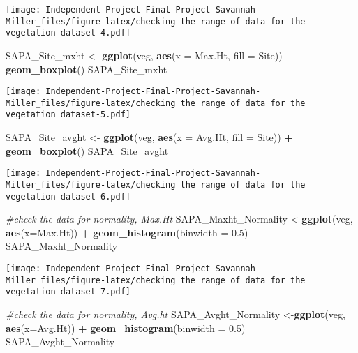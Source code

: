 \documentclass[
]{article}
\newenvironment{Shaded}{\begin{snugshade}}{\end{snugshade}}
\newcommand{\AttributeTok}[1]{\textcolor[rgb]{0.13,0.29,0.53}{#1}}
\newcommand{\CommentTok}[1]{\textcolor[rgb]{0.56,0.35,0.01}{\textit{#1}}}
\newcommand{\FloatTok}[1]{\textcolor[rgb]{0.00,0.00,0.81}{#1}}
\newcommand{\FunctionTok}[1]{\textcolor[rgb]{0.13,0.29,0.53}{\textbf{#1}}}
\newcommand{\NormalTok}[1]{#1}
\newcommand{\OtherTok}[1]{\textcolor[rgb]{0.56,0.35,0.01}{#1}}
\newcommand{\SpecialCharTok}[1]{\textcolor[rgb]{0.81,0.36,0.00}{\textbf{#1}}}
\begin{document}
\texttt{[image: Independent-Project-Final-Project-Savannah-Miller\_files/figure-latex/checking the range of data for the vegetation dataset-4.pdf]}

\begin{Shaded}
\begin{Highlighting}[]
\NormalTok{SAPA\_Site\_mxht }\OtherTok{\textless{}{-}} \FunctionTok{ggplot}\NormalTok{(veg, }\FunctionTok{aes}\NormalTok{(}\AttributeTok{x =}\NormalTok{ Max.Ht, }\AttributeTok{fill =}\NormalTok{ Site)) }\SpecialCharTok{+} \FunctionTok{geom\_boxplot}\NormalTok{()}
\NormalTok{SAPA\_Site\_mxht}
\end{Highlighting}
\end{Shaded}

\texttt{[image: Independent-Project-Final-Project-Savannah-Miller\_files/figure-latex/checking the range of data for the vegetation dataset-5.pdf]}

\begin{Shaded}
\begin{Highlighting}[]
\NormalTok{SAPA\_Site\_avght }\OtherTok{\textless{}{-}} \FunctionTok{ggplot}\NormalTok{(veg, }\FunctionTok{aes}\NormalTok{(}\AttributeTok{x =}\NormalTok{ Avg.Ht, }\AttributeTok{fill =}\NormalTok{ Site)) }\SpecialCharTok{+} \FunctionTok{geom\_boxplot}\NormalTok{()}
\NormalTok{SAPA\_Site\_avght}
\end{Highlighting}
\end{Shaded}

\texttt{[image: Independent-Project-Final-Project-Savannah-Miller\_files/figure-latex/checking the range of data for the vegetation dataset-6.pdf]}

\begin{Shaded}
\begin{Highlighting}[]
\CommentTok{\#check the data for normality, Max.Ht }
\NormalTok{SAPA\_Maxht\_Normality }\OtherTok{\textless{}{-}}\FunctionTok{ggplot}\NormalTok{(veg, }\FunctionTok{aes}\NormalTok{(}\AttributeTok{x=}\NormalTok{Max.Ht)) }\SpecialCharTok{+} \FunctionTok{geom\_histogram}\NormalTok{(}\AttributeTok{binwidth =} \FloatTok{0.5}\NormalTok{)}
\NormalTok{SAPA\_Maxht\_Normality}
\end{Highlighting}
\end{Shaded}

\texttt{[image: Independent-Project-Final-Project-Savannah-Miller\_files/figure-latex/checking the range of data for the vegetation dataset-7.pdf]}

\begin{Shaded}
\begin{Highlighting}[]
\CommentTok{\#check the data for normality, Avg.ht  }
\NormalTok{SAPA\_Avght\_Normality }\OtherTok{\textless{}{-}}\FunctionTok{ggplot}\NormalTok{(veg, }\FunctionTok{aes}\NormalTok{(}\AttributeTok{x=}\NormalTok{Avg.Ht)) }\SpecialCharTok{+} \FunctionTok{geom\_histogram}\NormalTok{(}\AttributeTok{binwidth =} \FloatTok{0.5}\NormalTok{)}
\NormalTok{SAPA\_Avght\_Normality}
\end{Highlighting}
\end{Shaded}
\end{document}
